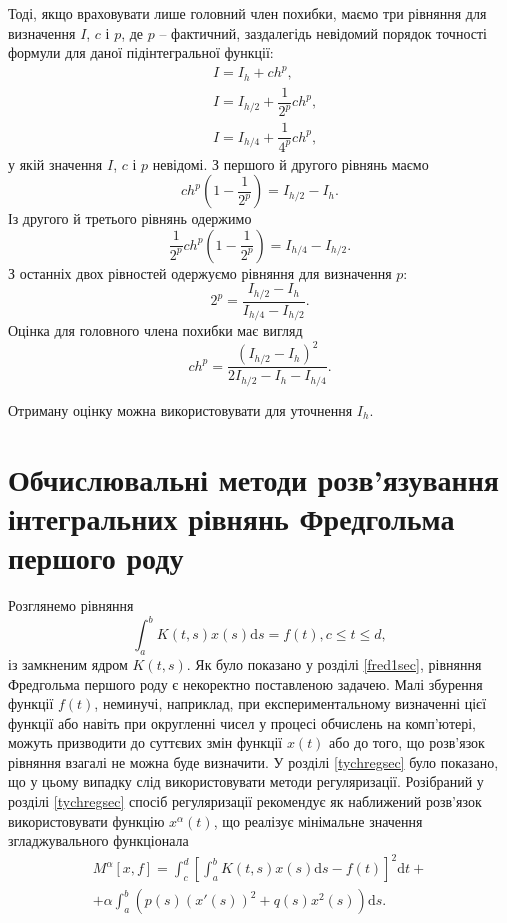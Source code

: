 \documentclass[14pt,twoside]{extreport}
\theoremstyle{mystyle}
\numberwithin{equation}{chapter}
\begin{document}
Тоді, якщо враховувати лише головний член похибки, маємо три рівняння для визначення $I$, $c$ і $p$, де $p$ -- фактичний, заздалегідь невідомий порядок точності формули для даної підінтегральної функції:
\begin{align*}
 &I=I_{h}+ch^{p},\\
 &I=I_{h/2}+\dfrac{1}{2^{p}}ch^{p},\\
 &I=I_{h/4}+\dfrac{1}{4^{p}}ch^{p},
\end{align*}
у якій значення $I$, $c$ і $p$ невідомі. З першого й другого рівнянь маємо
\[
 ch^{p}\left(1-\frac{1}{2^{p}}\right)=I_{h/2}-I_{h}.
\]
Із другого й третього рівнянь одержимо
\[
 \frac{1}{2^{p}}ch^{p}\left(1-\frac{1}{2^{p}}\right)=I_{h/4}-I_{h/2}.
\]
З останніх двох рівностей одержуємо рівняння для визначення $p$:
\[
 2^{p}=\frac{I_{h/2}-I_{h}}{I_{h/4}-I_{h/2}}.
\]
Оцінка для головного члена похибки має вигляд
\[
 ch^{p}=\frac{(I_{h/2}-I_{h})^{2}}{2I_{h/2}-I_{h}-I_{h/4}}.
\]

Отриману оцінку можна використовувати для уточнення $I_h$.

\chapter{Обчислювальні методи розв'язування інтегральних рівнянь Фред\-голь\-ма першого роду}

Розглянемо рівняння
\begin{equation}\label{numfred1}
 \int_{a}^{b} K(t, s) x(s) \mathrm{d}s = f(t), c\leqslant t \leqslant d,
\end{equation}
із замкненим ядром $K(t, s)$. Як було показано у розділі \ref{fred1sec}, рівняння Фредгольма першого роду є некоректно поставленою задачею. Малі збурення функції $f(t)$, неминучі, наприклад, при експериментальному визначенні цієї функції або навіть при округленні чисел у процесі обчислень на комп'ютері, можуть призводити до суттєвих змін функції $x(t)$ або до того, що розв'язок рівняння взагалі не можна буде визначити. У розділі \ref{tychregsec} було показано, що у цьому випадку слід використовувати методи регуляризації. Розібраний у розділі \ref{tychregsec} спосіб регуляризації рекомендує як наближений розв'язок використовувати функцію $x^\alpha(t)$, що реалізує мінімальне значення згладжувального функціонала
\begin{multline}\label{functma}
 M^{\alpha}[x, f] = \int_{c}^{d}\left[\int_{a}^{b}K(t, s)x(s)\mathrm{d}s - f(t)\right]^2\mathrm{d}t +\\
 +\alpha\int_{a}^{b} \left(p(s)(x'(s))^2 + q(s)x^2(s)\right)\mathrm{d}s.
\end{multline}
\end{document}
